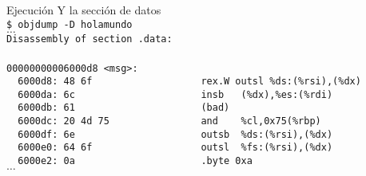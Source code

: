 \documentclass[aspectratio=169]{beamer}
\begin{document}
\begin{frame}[fragile,t]{Ejecución}
    \small
    \textcolor{verdeuca}{Y la sección de datos}\\
    \pause
    \vspace{0.2cm}
    \verb|$ objdump -D holamundo|\\
    \vspace{0.2cm}
    \pause
    $\dots$\\
    \vspace{0.2cm}
    \verb|Disassembly of section .data:|\\
    \verb||\\
    \verb|00000000006000d8 <msg>:|\\
    \verb|  6000d8:	48 6f                	rex.W outsl %ds:(%rsi),(%dx)|\\
    \verb|  6000da:	6c                   	insb   (%dx),%es:(%rdi)|\\
    \verb|  6000db:	61                   	(bad)  |\\
    \verb|  6000dc:	20 4d 75             	and    %cl,0x75(%rbp)|\\
    \verb|  6000df:	6e                   	outsb  %ds:(%rsi),(%dx)|\\
    \verb|  6000e0:	64 6f                	outsl  %fs:(%rsi),(%dx)|\\
    \verb|  6000e2:	0a                   	.byte 0xa|\\
    \vspace{0.2cm}
    $\dots$
\end{frame}
\end{document}
